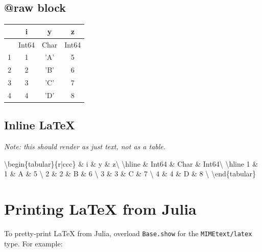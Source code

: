 \subsection{@raw block}



\label{242231064951882573}{}



\begin{tabular}{r|ccc}
        & i & y & z\\
        \hline
        & Int64 & Char & Int64\\
        \hline
        1 & 1 & 'A' & 5 \\
        2 & 2 & 'B' & 6 \\
        3 & 3 & 'C' & 7 \\
        4 & 4 & 'D' & 8 \\
\end{tabular}



\subsection{Inline LaTeX}



\label{13671591622472767230}{}


\emph{Note: this should render as just text, not as a table.}



{\textbackslash}begin\{tabular\}\{r|ccc\}
        \& i \& y \& z{\textbackslash}
        {\textbackslash}hline
        \& Int64 \& Char \& Int64{\textbackslash}
        {\textbackslash}hline
        1 \& 1 \& {\textquotesingle}A{\textquotesingle} \& 5 {\textbackslash}
        2 \& 2 \& {\textquotesingle}B{\textquotesingle} \& 6 {\textbackslash}
        3 \& 3 \& {\textquotesingle}C{\textquotesingle} \& 7 {\textbackslash}
        4 \& 4 \& {\textquotesingle}D{\textquotesingle} \& 8 {\textbackslash}
{\textbackslash}end\{tabular\}



\section{Printing LaTeX from Julia}



\label{5228730505895189776}{}


To pretty-print LaTeX from Julia, overload \texttt{Base.show} for the
\texttt{MIME{\textquotedbl}text/latex{\textquotedbl}} type. For example:




